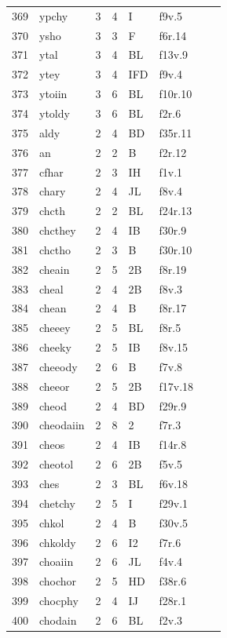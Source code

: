 \documentclass[11pt,a4paper]{article}
\begin{document}
\begin{landscape}
\begin{longtable}{@{}r>{\ttfamily}lrrl>{\ttfamily}l>{\raggedright\arraybackslash}p{80mm}>{\raggedright\arraybackslash}p{36mm}@{}}
369 & ypchy & 3 & 4 & I & f9v.5 &  & \\
370 & ysho & 3 & 3 & F & f6r.14 &  & \\
371 & ytal & 3 & 4 & BL & f13v.9 &  & \\
372 & ytey & 3 & 4 & IFD & f9v.4 &  & \\
373 & ytoiin & 3 & 6 & BL & f10r.10 &  & \\
374 & ytoldy & 3 & 6 & BL & f2r.6 &  & \\
375 & aldy & 2 & 4 & BD & f35r.11 &  & \\
376 & an & 2 & 2 & B & f2r.12 &  & \\
377 & cfhar & 2 & 3 & IH & f1v.1 &  & \\
378 & chary & 2 & 4 & JL & f8v.4 &  & \\
379 & chcth & 2 & 2 & BL & f24r.13 &  & \\
380 & chcthey & 2 & 4 & IB & f30r.9 &  & \\
381 & chctho & 2 & 3 & B & f30r.10 &  & \\
382 & cheain & 2 & 5 & 2B & f8r.19 &  & \\
383 & cheal & 2 & 4 & 2B & f8v.3 &  & \\
384 & chean & 2 & 4 & B & f8r.17 &  & \\
385 & cheeey & 2 & 5 & BL & f8r.5 &  & \\
386 & cheeky & 2 & 5 & IB & f8v.15 &  & \\
387 & cheeody & 2 & 6 & B & f7v.8 &  & \\
388 & cheeor & 2 & 5 & 2B & f17v.18 &  & \\
389 & cheod & 2 & 4 & BD & f29r.9 &  & \\
390 & cheodaiin & 2 & 8 & 2 & f7r.3 &  & \\
391 & cheos & 2 & 4 & IB & f14r.8 &  & \\
392 & cheotol & 2 & 6 & 2B & f5v.5 &  & \\
393 & ches & 2 & 3 & BL & f6v.18 &  & \\
394 & chetchy & 2 & 5 & I & f29v.1 &  & \\
395 & chkol & 2 & 4 & B & f30v.5 &  & \\
396 & chkoldy & 2 & 6 & I2 & f7r.6 &  & \\
397 & choaiin & 2 & 6 & JL & f4v.4 &  & \\
398 & chochor & 2 & 5 & HD & f38r.6 &  & \\
399 & chocphy & 2 & 4 & IJ & f28r.1 &  & \\
400 & chodain & 2 & 6 & BL & f2v.3 &  & \\

\end{longtable}
\end{landscape}
\end{document}
